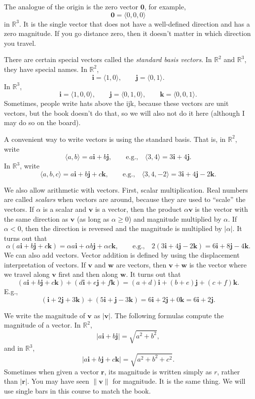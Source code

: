 \documentclass[12pt]{article}
\newcommand{\sabs}[1]{\lvert {#1} \rvert}
\newcommand{\snorm}[1]{\lVert {#1} \rVert}
\newcommand{\R}{{\mathbb{R}}}
\newcommand{\veci}{\mathbf{i}}
\newcommand{\vecj}{\mathbf{j}}
\newcommand{\veck}{\mathbf{k}}
\begin{document}
The analogue of the origin is the zero vector $\mathbf{0}$, for example,
\[
\mathbf{0} = \langle 0,0,0 \rangle
\]
in $\R^3$.
It is the single vector that does not have a well-defined direction
and has a zero magnitude.
If you go distance zero, then it doesn't matter in which direction
you travel.

There are certain special vectors called the
\emph{standard basis vectors}.
In $\R^2$ and $\R^3$, they have special names.
In $\R^2$,
\[
\veci = \langle 1 , 0 \rangle, \qquad
\vecj = \langle 0 , 1 \rangle.
\]
In $\R^3$,
\[
\veci = \langle 1, 0, 0 \rangle, \qquad
\vecj = \langle 0, 1, 0 \rangle, \qquad
\veck = \langle 0, 0, 1 \rangle.
\]
Sometimes, people write hats above the ijk,
because these vectors are
unit vectors, but the book doesn't do that, so we will also not do it
here (although I may do so on the board).

A convenient way to write vectors is using the standard basis.
That is, in $\R^2$, write
\[
\langle a,b \rangle = a \veci + b \vecj,
\qquad \text{e.g.,} \quad
\langle 3,4 \rangle = 3 \veci + 4 \vecj.
\]
In $\R^3$, write
\[
\langle a,b,c \rangle = a \veci + b \vecj + c \veck,
\qquad \text{e.g.,} \quad
\langle 3,4,-2 \rangle = 3 \veci + 4 \vecj - 2 \veck.
\]

We also allow arithmetic with vectors.
First, scalar multiplication.
Real numbers are called \emph{scalars} when vectors are around,
because they are used to ``scale'' the vectors.
If $\alpha$ is a scalar and $\mathbf{v}$
is a vector, then the product $\alpha\mathbf{v}$ is the vector with the same direction as
$\mathbf{v}$ (as long as $\alpha \geq 0$) and magnitude multiplied by $\alpha$.
If $\alpha < 0$, then the direction is reversed and the magnitude is multiplied by
$\sabs{\alpha}$.
It turns out that
\[
\alpha ( a \veci + b \vecj + c \veck ) =
\alpha a \veci + \alpha b \vecj + \alpha c \veck,
\qquad \text{e.g.,} \quad
2 ( 3 \veci + 4 \vecj - 2 \veck ) =
6 \veci + 8 \vecj - 4 \veck
.
\]
We can also add vectors.
Vector addition is defined by using the displacement interpretation of vectors.
If $\mathbf{v}$ and $\mathbf{w}$ are vectors,
then $\mathbf{v}+\mathbf{w}$ is the vector where we travel along $\mathbf{v}$ first
and then along $\mathbf{w}$.
It turns out that
\[
( a \veci + b \vecj + c \veck ) +
( d \veci + e \vecj + f \veck ) =
(a+d) \veci + (b+e) \vecj + (c+f) \veck .
\]
E.g.,
\[
( \veci + 2 \vecj + 3 \veck ) +
( 5 \veci + \vecj - 3 \veck ) =
6 \veci + 2 \vecj + 0 \veck = 6 \veci + 2 \vecj
.
\]

We write the magnitude of $\mathbf{v}$ as
$\sabs{\mathbf{v}}$.
The following formulas compute the magnitude of a vector.
In $\R^2$,
\[
\sabs{a \veci + b \vecj}
=
\sqrt{a^2+b^2} ,
\]
and in $\R^3$,
\[
\sabs{a \veci + b \vecj + c \veck}
=
\sqrt{a^2+b^2+c^2} .
\]
Sometimes when given a vector $\mathbf{r}$, its magnitude is written simply as
$r$, rather than $\sabs{\mathbf{r}}$.
You may have seen $\snorm{\mathbf{v}}$ for magnitude. 
It is the same thing.
We will use single bars in this course to
match the book.
\end{document}
